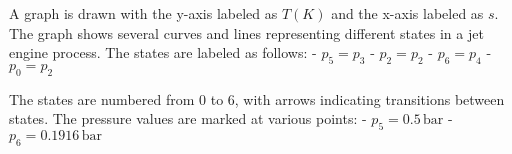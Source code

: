 A graph is drawn with the y-axis labeled as \( T(K) \) and the x-axis labeled as \( s \). The graph shows several curves and lines representing different states in a jet engine process. The states are labeled as follows:  
- \( p_5 = p_3 \)  
- \( p_2 = p_2 \)  
- \( p_6 = p_4 \)  
- \( p_0 = p_2 \)  

The states are numbered from 0 to 6, with arrows indicating transitions between states. The pressure values are marked at various points:  
- \( p_5 = 0.5 \, \text{bar} \)  
- \( p_6 = 0.1916 \, \text{bar} \)